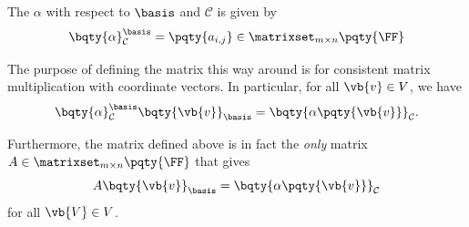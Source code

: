 \begin{definition}
    The  \(\alpha\) with respect to \(\basis\) and \(\mathcal{C}\) is given by
    \[
        \bqty{\alpha}_{\mathcal{C}}^{\basis} = \pqty{a_{i, j}} \in \matrixset_{m \times n} \pqty{\FF}
    \]
\end{definition}

The purpose of defining the matrix this way around is for consistent matrix multiplication with coordinate vectors. In particular, for all \(\vb{v} \in V\), we have
\[
    \bqty{\alpha}_{\mathcal{C}}^{\basis} \bqty{\vb{v}}_{\basis} = \bqty{\alpha\pqty{\vb{v}}}_{\mathcal{C}}.
\]

Furthermore, the matrix defined above is in fact the \emph{only} matrix \(A \in \matrixset_{m \times n} \pqty{\FF}\) that gives
\[
    A \bqty{\vb{v}}_{\basis} = \bqty{\alpha\pqty{\vb{v}}}_{\mathcal{C}}
\]
for all \(\vb{V} \in V\).

